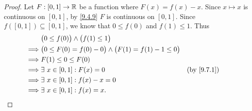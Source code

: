 \begin{proof}
  Let \(F : [0, 1] \to \mathbb{R}\) be a function where \(F(x) = f(x) - x\).
  Since \(x \mapsto x\) is continuous on \([0, 1]\), by \cref{9.4.9} \(F\) is continuous on \([0, 1]\).
  Since \(f([0, 1]) \subseteq [0, 1]\), we know that \(0 \leq f(0)\) and \(f(1) \leq 1\).
  Thus
  \begin{align*}
             & \big(0 \leq f(0)\big) \land \big(f(1) \leq 1\big)                                                     \\
    \implies & \big(0 \leq F(0) = f(0) - 0\big) \land \big(F(1) = f(1) - 1 \leq 0\big)                               \\
    \implies & F(1) \leq 0 \leq F(0)                                                                                 \\
    \implies & \exists\ x \in [0, 1] : F(x) = 0                                        &  & \text{(by \cref{9.7.1})} \\
    \implies & \exists\ x \in [0, 1] : f(x) - x = 0                                                                  \\
    \implies & \exists\ x \in [0, 1] : f(x) = x.
  \end{align*}
\end{proof}